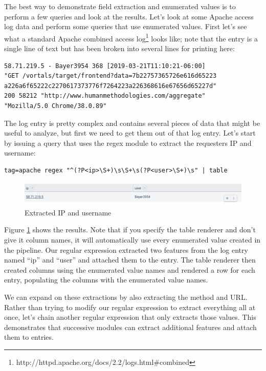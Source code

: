 The best way to demonstrate field extraction and enumerated values is
to perform a few queries and look at the results. Let's look at some
Apache access log data and perform some queries that use enumerated
values. First let's see what a standard Apache combined access
log\footnote{http://httpd.apache.org/docs/2.2/logs.html\#combined} looks like;
note that the entry is a single line of text but has been broken into
several lines for printing here:

\begin{Verbatim}[breaklines=true]
58.71.219.5 - Bayer3954 368 [2019-03-21T11:10:21-06:00] 
"GET /vortals/target/frontend?data=7b22757365726e616d65223
a226a6f65222c2270617373776f7264223a226368616e67656d65227d"
200 58212 "http://www.humanmethodologies.com/aggregate"
"Mozilla/5.0 Chrome/38.0.89"
\end{Verbatim}

The log entry is pretty complex and contains several pieces of data
that might be useful to analyze, but first we need to get them out of
that log entry. Let's start by issuing a query that uses the regex
module to extract the requesters IP and username:

\begin{Verbatim}[breaklines=true]
tag=apache regex "^(?P<ip>\S+)\s\S+\s(?P<user>\S+)\s" | table
\end{Verbatim}

\begin{figure}
	\includegraphics[width=0.8\linewidth]{images/extract-ip.png}
	\caption{Extracted IP and username}
	\label{fig:extract-ip}
\end{figure}

Figure \ref{fig:extract-ip} shows the results.
Note that if you specify the table renderer and don't give it column
names, it will automatically use every enumerated value created in the
pipeline. Our regular expression extracted two features from the log
entry named ``ip'' and ``user'' and attached them to the entry. The
table renderer then created columns using the enumerated value names
and rendered a row for each entry, populating the columns with the
enumerated value names.

We can expand on these extractions by also extracting the method and
URL. Rather than trying to modify our regular expression to extract
everything all at once, let's chain another regular expression that only
extracts those values. This demonstrates that successive modules can
extract additional features and attach them to entries.

